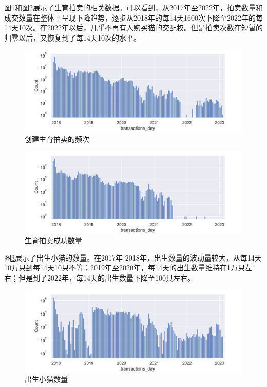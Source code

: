 \documentclass{myreport}
\begin{document}
图\ref{fig:siringauction count}和图\ref{fig:bidOnSA count}展示了生育拍卖的相关数据。可以看到，从2017年至2022年，拍卖数量和成交数量在整体上呈现下降趋势，逐步从2018年的每14天1600次下降至2022年的每14天10次。在2022年以后，几乎不再有人购买猫的交配权。但是拍卖次数在短暂的归零以后，又恢复到了每14天10次的水平。
\begin{figure}[!htbp]
	\centering
	\includegraphics[width=\linewidth]{figure/siringauction count.pdf}
	\caption{创建生育拍卖的频次}
	\label{fig:siringauction count}
\end{figure}
\begin{figure}[!htbp]
	\centering
	\includegraphics[width=\linewidth]{figure/bidOnSA count.pdf}
	\caption{生育拍卖成功数量}
	\label{fig:bidOnSA count}
\end{figure}

图\ref{fig:givebrith count}展示了出生小猫的数量。在2017年-2018年，出生数量的波动量较大，从每14天10万只到每14天10只不等；2019年至2020年，每14天的出生数量维持在1万只左右；但是到了2022年，每14天的出生数量下降至100只左右。

\begin{figure}[!htbp]
	\centering
	\includegraphics[width=\linewidth]{figure/givebrith count.pdf}
	\caption{出生小猫数量}
	\label{fig:givebrith count}
\end{figure}
\end{document}
